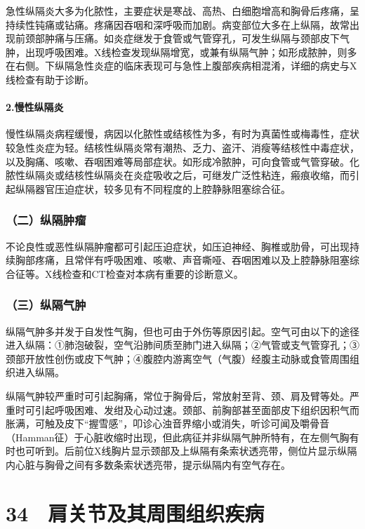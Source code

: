 急性纵隔炎大多为化脓性，主要症状是寒战、高热、白细胞增高和胸骨后疼痛，呈持续性钝痛或钻痛。疼痛因吞咽和深呼吸而加剧。病变部位大多在上纵隔，故常出现前颈部肿痛与压痛。如炎症继发于食管或气管穿孔，可发生纵隔与颈部皮下气肿，出现呼吸困难。X线检查发现纵隔增宽，或兼有纵隔气肿；如形成脓肿，则多在右侧。下纵隔急性炎症的临床表现可与急性上腹部疾病相混淆，详细的病史与X线检查有助于诊断。

\paragraph{2.慢性纵隔炎}

慢性纵隔炎病程缓慢，病因以化脓性或结核性为多，有时为真菌性或梅毒性，症状较急性炎症为轻。结核性纵隔炎常有潮热、乏力、盗汗、消瘦等结核性中毒症状，以及胸痛、咳嗽、吞咽困难等局部症状。如形成冷脓肿，可向食管或气管穿破。化脓性纵隔炎或结核性纵隔炎在炎症吸收之后，可继发广泛性粘连，瘢痕收缩，而引起纵隔器官压迫症状，较多见有不同程度的上腔静脉阻塞综合征。

\subsubsection{（二）纵隔肿瘤}

不论良性或恶性纵隔肿瘤都可引起压迫症状，如压迫神经、胸椎或肋骨，可出现持续胸部疼痛，且常伴有呼吸困难、咳嗽、声音嘶哑、吞咽困难以及上腔静脉阻塞综合征等。X线检查和CT检查对本病有重要的诊断意义。

\subsubsection{（三）纵隔气肿}

纵隔气肿多并发于自发性气胸，但也可由于外伤等原因引起。空气可由以下的途径进入纵隔：①肺泡破裂，空气沿肺间质至肺门进入纵隔；②气管或支气管穿孔；③颈部开放性创伤或皮下气肿；④腹腔内游离空气（气腹）经腹主动脉或食管周围组织进入纵隔。

纵隔气肿较严重时可引起胸痛，常位于胸骨后，常放射至背、颈、肩及臂等处。严重时可引起呼吸困难、发绀及心动过速。颈部、前胸部甚至面部皮下组织因积气而胀满，可触及皮下“握雪感”，叩诊心浊音界缩小或消失，听诊可闻及嚼骨音（Hamman征）于心脏收缩时出现，但此病征并非纵隔气肿所特有，在左侧气胸有时也可听到。后前位X线胸片显示颈部及上纵隔有条索状透亮带，侧位片显示纵隔内心脏与胸骨之间有多数条索状透亮带，提示纵隔内有空气存在。

\protect\hypertarget{text00099.html}{}{}

\section{34　肩关节及其周围组织疾病}

